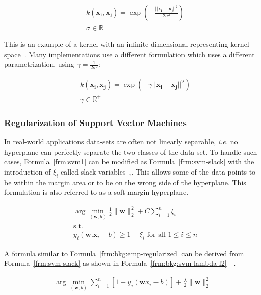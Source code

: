 \begin{align}
  &k(\mathbf{x_i}, \mathbf{x_j}) = \exp\left(-\frac{||\mathbf{x_i} - \mathbf{x_j}||^2}{2\sigma^2}\right) \nonumber \\
  &\sigma \in \mathbb{R}
  \label{frm:rbf-kernel1}
\end{align}

This is an example of a kernel with an infinite dimensional representing kernel space~\cite{steinwart2006explicit}. Many implementations use a different formulation which uses a different parametrization, using $\gamma=\frac{1}{2\sigma^2}$:

\begin{align}
  &k(\mathbf{x_i}, \mathbf{x_j}) = \exp\left(-\gamma||\mathbf{x_i} - \mathbf{x_j}||^2\right) \nonumber \\
  &\gamma \in \mathbb{R}^+
  \label{frm:rbf-kernel2}
\end{align}

\subsubsection{Regularization of Support Vector Machines}
In real-world applications data-sets are often not linearly separable, \emph{i.e.} no hyperplane can perfectly separate the two classes of the data-set. To handle such cases, Formula~\ref{frm:svm1} can be modified as Formula~\ref{frm:svm-slack} with the introduction of $\xi_i$ called slack variables~\cite{cortes1995support},\cite[Ch. 7.5]{learning-with-kernels}. This allows some of the data points to be within the margin area or to be on the wrong side of the hyperplane. This formulation is also referred to as a soft margin hyperplane.

\begin{align}
  &\arg\min_{(\mathbf{w},b)}\frac{1}{2}\|\mathbf{w}\|_2^2 + C \sum_{i=1}^n \xi_i \nonumber \\
  &\text{s.t.} \nonumber \\
  &y_i (\mathbf{w} . \mathbf{x}_i - b)\geq 1 - \xi_i \text{ for all } 1 \leq i \leq n
  \label{frm:svm-slack}
\end{align}

A formula similar to Formula~\ref{frm:bkg:emp-regularized} can be derived from Formula~\ref{frm:svm-slack} as shown in Formula~\ref{frm:bkg:svm-lambda-l2}~\cite[Ch. 12]{statistical-learning}~\cite{hastie2004entire}.

\begin{align}
  \arg\min_{(\mathbf{w},b)}\sum_{i=1}^{n}[1-y_i(\mathbf{w}x_i - b)] + \frac{\lambda}{2}\|\mathbf{w}\|_2^2
  \label{frm:bkg:svm-lambda-l2}
\end{align}

